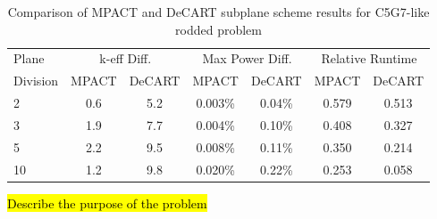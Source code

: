 \begin{table}
\caption{Comparison of MPACT and DeCART subplane scheme results for C5G7-like rodded problem}
\begin{center}
\begin{tabular}{|l|c|c|c|c|c|c|}\hline
Plane & \multicolumn{2}{|c|}{k-eff Diff.} & \multicolumn{2}{|c|}{Max Power Diff.} & \multicolumn{2}{|c|}{Relative Runtime} \\ \cline{2-7}
Division & MPACT & DeCART & MPACT & DeCART & MPACT & DeCART \\ \hline
2 & 0.6 & 5.2 & 0.003\% & 0.04\% & 0.579 & 0.513 \\ \hline
3 & 1.9 & 7.7 & 0.004\% & 0.10\% & 0.408 & 0.327 \\ \hline
5 & 2.2 & 9.5 & 0.008\% & 0.11\% & 0.350 & 0.214 \\ \hline
10 & 1.2 & 9.8 & 0.020\% & 0.22\% & 0.253 & 0.058 \\ \hline
\end{tabular}
\end{center}
\end{table}

\hl{Describe the purpose of the problem}

\begin{table}
\caption{Comparison of subplane scheme to traditional 2D/1D for VERA Progression Problem 4}
\begin{center}
\end{center}
\end{table}

